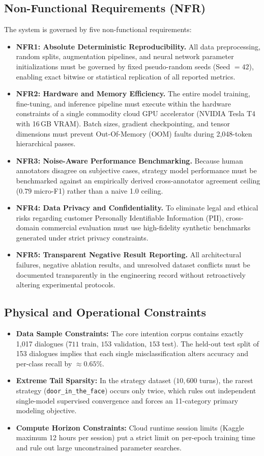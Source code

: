 \subsection{Non-Functional Requirements (NFR)}
The system is governed by five non-functional requirements:
\begin{itemize}
  \item \textbf{NFR1: Absolute Deterministic Reproducibility.} All data preprocessing, random splits, augmentation pipelines, and neural network parameter initializations must be governed by fixed pseudo-random seeds (Seed $= 42$), enabling exact bitwise or statistical replication of all reported metrics.
  \item \textbf{NFR2: Hardware and Memory Efficiency.} The entire model training, fine-tuning, and inference pipeline must execute within the hardware constraints of a single commodity cloud GPU accelerator (NVIDIA Tesla T4 with 16\,GB VRAM). Batch sizes, gradient checkpointing, and tensor dimensions must prevent Out-Of-Memory (OOM) faults during 2,048-token hierarchical passes.
  \item \textbf{NFR3: Noise-Aware Performance Benchmarking.} Because human annotators disagree on subjective cases, strategy model performance must be benchmarked against an empirically derived cross-annotator agreement ceiling ($0.79$ micro-F1) rather than a naive 1.0 ceiling.
  \item \textbf{NFR4: Data Privacy and Confidentiality.} To eliminate legal and ethical risks regarding customer Personally Identifiable Information (PII), cross-domain commercial evaluation must use high-fidelity synthetic benchmarks generated under strict privacy constraints.
  \item \textbf{NFR5: Transparent Negative Result Reporting.} All architectural failures, negative ablation results, and unresolved dataset conflicts must be documented transparently in the engineering record without retroactively altering experimental protocols.
\end{itemize}

\subsection{Physical and Operational Constraints}
\begin{itemize}
  \item \textbf{Data Sample Constraints:} The core intention corpus contains exactly 1,017 dialogues ($711$ train, $153$ validation, $153$ test). The held-out test split of 153 dialogues implies that each single misclassification alters accuracy and per-class recall by $\approx 0.65\%$.
  \item \textbf{Extreme Tail Sparsity:} In the strategy dataset ($10{,}600$ turns), the rarest strategy (\texttt{door\_in\_the\_face}) occurs only twice, which rules out independent single-model supervised convergence and forces an 11-category primary modeling objective.
  \item \textbf{Compute Horizon Constraints:} Cloud runtime session limits (Kaggle maximum 12 hours per session) put a strict limit on per-epoch training time and rule out large unconstrained parameter searches.
\end{itemize}

